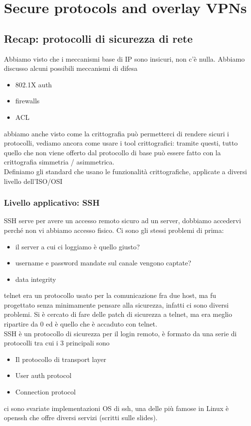 \documentclass[12pt, oneside]{extbook} %
\begin{document}
\chapter{Secure protocols and overlay VPNs}
\section{Recap: protocolli di sicurezza di rete}
Abbiamo visto che i meccanismi base di IP sono insicuri, non c'è nulla. Abbiamo discusso alcuni possibili meccanismi di difesa
\begin{itemize}
\item 802.1X auth
\item firewalls
\item ACL
\end{itemize}
abbiamo anche visto come la crittografia può permetterci di rendere sicuri i protocolli, vediamo ancora come usare i tool crittografici: tramite questi, tutto quello che non viene offerto dal protocollo di base può essere fatto con la crittografia simmetria / asimmetrica.\\ Definiamo gli standard che usano le funzionalità crittografiche, applicate a diversi livello dell'ISO/OSI
\subsection{Livello applicativo: SSH}
SSH serve per avere un accesso remoto sicuro ad un server, dobbiamo accedervi perché non vi abbiamo accesso fisico. Ci sono gli stessi problemi di prima:
\begin{itemize}
\item il server a cui ci loggiamo è quello giusto?
\item username e password mandate sul canale vengono captate?
\item data integrity
\end{itemize}
telnet era un protocollo usato per la comunicazione fra due host, ma fu progettato senza minimamente pensare alla sicurezza, infatti ci sono diversi problemi. Si è cercato di fare delle patch di sicurezza a telnet, ma era meglio ripartire da 0 ed è quello che è accaduto con telnet.\\ SSH è un protocollo di sicurezza per il login remoto, è formato da una serie di protocolli tra cui i 3 principali sono
\begin{itemize}
\item Il protocollo di transport layer
\item User auth protocol
\item Connection protocol
\end{itemize}
ci sono svariate implementazioni OS di ssh, una delle più famose in Linux è openssh che offre diversi servizi (scritti sulle slides).
\end{document}
